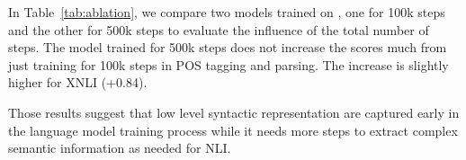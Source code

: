 In Table~\ref{tab:ablation}, we compare two models trained on \ccnet, one for 100k steps and the other for 500k steps to evaluate the influence of the total number of steps. The model trained for 500k steps does not increase the scores much from just training for 100k steps in POS tagging and parsing.
The increase is slightly higher for XNLI (+0.84).

Those results suggest that low level syntactic representation are captured early in the language model training process while it needs more steps to extract complex semantic information as needed for NLI.